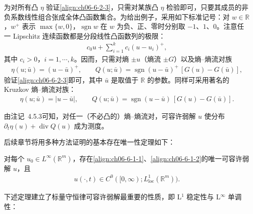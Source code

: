 \documentclass[../../main.tex]{subfiles}
\begin{document}
为对所有凸 $\eta$ 验证\eqref{align:ch06-6-2-3}，只需对某族凸 $\eta$ 检验即可，只要其成员的非负系数线性组合张成全体凸函数集合。为给出例子，采用如下标准记号：对 $w\in\mathbb{R}$，$w^{+}$ 表示 $\max\{w,0\}$，$\operatorname{sgn}w$ 在 $w$ 为负、正、零时分别取 $-1$、$1$、$0$。注意任一 Lipschitz 连续函数都是分段线性凸函数列的极限：
\begin{align}
c_{0}u+\sum_{i=1}^{k}c_{i}(u-u_{i})^{+},
\label{align:ch06-6-2-4}
\end{align}
其中 $c_{i}>0$，$i=1,\cdots,k$。因而，只需对熵 $\pm u$（熵流 $\pm G$）以及熵--熵流对族
\begin{align}
\eta(u;\bar{u})=(u-\bar{u})^{+},\qquad Q(u;\bar{u})=\operatorname{sgn}(u-\bar{u})^{+}\,[G(u)-G(\bar{u})],
\label{align:ch06-6-2-5}
\end{align}
验证\eqref{align:ch06-6-2-3}即可，其中 $\bar{u}$ 是取值于 $\mathbb{R}$ 的参数。同样可采用著名的 Kruzkov 熵--熵流对族：
\begin{align}
\eta(u;\bar{u})=|u-\bar{u}|,\qquad Q(u;\bar{u})=\operatorname{sgn}(u-\bar{u})\,[G(u)-G(\bar{u})].
\label{align:ch06-6-2-6}
\end{align}

由注记~4.5.3可知，对任一（不必凸的）熵--熵流对，可容许弱解 $u$ 使分布 $\partial_{t}\eta(u)+\operatorname{div}Q(u)$ 成为测度。


后续章节将用多种方法证明的基本存在唯一性定理如下：

\begin{theorem}\label{theorem:ch06-6-2-2}
对每个 $u_{0}\in L^{\infty}(\mathbb{R}^{m})$，存在\eqref{align:ch06-6-1-1}、\eqref{align:ch06-6-1-2}的唯一可容许弱解 $u$，且
\begin{align}
u(\cdot,t)\in C^{0}([0,\infty);L^{1}_{\mathrm{loc}}(\mathbb{R}^{m})).
\label{align:ch06-6-2-7}
\end{align}
\end{theorem}

下述定理建立了标量守恒律可容许弱解最重要的性质，即 L$^{1}$ 稳定性与 L$^{\infty}$ 单调性：
\end{document}
